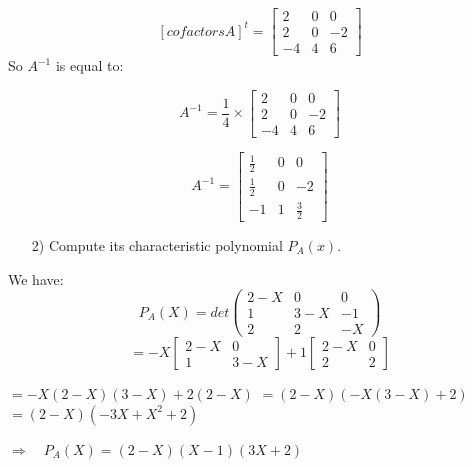 \documentclass[12pt,a4paper]{article}
\begin{document}
\[
[cofactors A]^{t} =
\begin{bmatrix}
2 & 0 & 0  \\
2 & 0 & -2   \\
-4 & 4 & 6
\end{bmatrix}
\]
So $A^{-1}$ is equal to:

\[
A^{-1} = \frac{1}{4}\times 
\begin{bmatrix}
2 & 0 & 0  \\
2 & 0 & -2   \\
-4 & 4 & 6
\end{bmatrix}	    
\]

\[
A^{-1} = \begin{bmatrix}
\frac{1}{2} & 0 & 0 \\
\frac{1}{2} & 0 & -2 \\
-1 & 1 & \frac{3}{2} 
\end{bmatrix} 
\]
\begin{enumerate}
	\item[2)]  Compute its characteristic polynomial $P_A(x)$.
\end{enumerate}
We have:
\[
P_{A}(X) = det
\begin{pmatrix}
2-X & 0 & 0\\
1 & 3-X & -1\\
2 & 2 & -X
\end{pmatrix} 
\]
\[=
-X
\begin{bmatrix}
2-X & 0 \\
1 & 3-X 
\end{bmatrix} + 1
\begin{bmatrix}
2-X & 0 \\
2 & 2 
\end{bmatrix} 
\]
\begin{center}
	$= -X(2-X)(3-X) + 2(2-X) $
	$= (2-X)(-X(3-X)+2) \quad$
	$ = (2-X)(-3X + X^2 + 2) \quad$   
	
	
	$ \Rightarrow \quad P_{A}(X) = (2-X)(X-1)(3X+2)$
\end{center}
\end{document}
